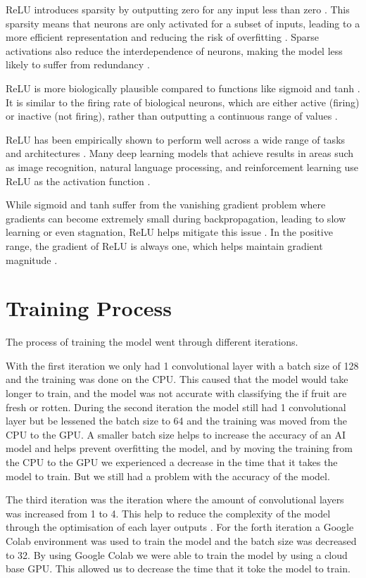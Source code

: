 \documentclass[conference]{IEEEtran}
\begin{document}
ReLU introduces sparsity by outputting zero for any input less than zero \cite{b31}. This sparsity means that neurons are only activated for a subset of inputs, leading to a more efficient representation and reducing the risk of overfitting \cite{b31}. Sparse activations also reduce the interdependence of neurons, making the model less likely to suffer from redundancy \cite{b31}.

ReLU is more biologically plausible compared to functions like sigmoid and tanh \cite{b30}. It is similar to the firing rate of biological neurons, which are either active (firing) or inactive (not firing), rather than outputting a continuous range of values \cite{b31}.

ReLU has been empirically shown to perform well across a wide range of tasks and architectures \cite{b32}. Many deep learning models that achieve results in areas such as image recognition, natural language processing, and reinforcement learning use ReLU as the activation function \cite{b32}.

While sigmoid and tanh suffer from the vanishing gradient problem where gradients can become extremely small during backpropagation, leading to slow learning or even stagnation, ReLU helps mitigate this issue \cite{b30}. In the positive range, the gradient of ReLU is always one, which helps maintain gradient magnitude \cite{b30}.

\section{Training Process}

The process of training the model went through different iterations.

With the first iteration we only had 1 convolutional layer with a batch size of 128 and the training was done on the CPU. This caused that the model would take longer to train, and the model was not accurate with classifying the if fruit are fresh or rotten. During the second iteration the model still had 1 convolutional layer but be lessened the batch size to 64 and the training was moved from the CPU to the GPU. A smaller batch size helps to increase the accuracy of an AI model \cite{b2} and helps prevent overfitting the model, and by moving the training from the CPU to the GPU we experienced a decrease in the time that it takes the model to train. But we still had a problem with the accuracy of the model.

The third iteration was the iteration where the amount of convolutional layers was increased from 1 to 4. This help to reduce the complexity of the model through the optimisation of each layer outputs \cite{b3}. For the forth iteration a Google Colab environment was used to train the model and the batch size was decreased to 32. By using Google Colab we were able to train the model by using a cloud base GPU. This allowed us to decrease the time that it toke the model to train.
\end{document}
